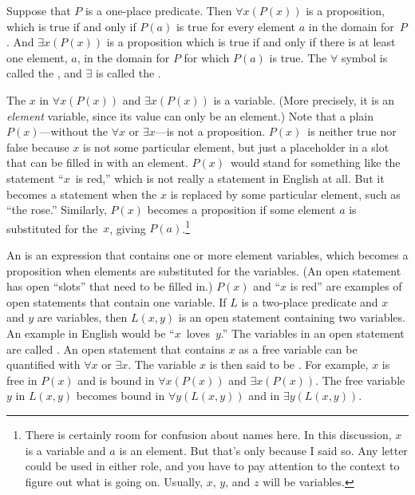\begin{definition}
Suppose that $P$ is a one-place predicate.  Then $\forall x(P(x))$ is
a proposition, which is true if and only if $P(a)$ is true for every
element $a$ in the domain for~$P$.  And $\exists x(P(x))$
is a proposition which is true if and only if there is at least one
element, $a$, in the domain for $P$ for which $P(a)$ is
true.  The $\forall$ symbol is called the ,
and $\exists$ is called the .
\end{definition}

The $x$ in $\forall x(P(x))$ and $\exists x(P(x))$ is a variable.
(More precisely, it is an \emph{element} variable, since its value
can only be an element.)
Note that a plain $P(x)$---without the $\forall x$ or $\exists x$---is
not a proposition.  $P(x)$~is neither true nor false because $x$
is not some particular element, but just a placeholder in a slot that
can be filled in with an element.  $P(x)$~would stand for
something like the statement ``$x$~is red,'' which is not really a
statement in English at all.  But it becomes a statement when
the $x$ is replaced by some particular element, such as ``the rose.''
Similarly, $P(x)$ becomes a proposition if some element $a$ is substituted
for the~$x$, giving $P(a)$.\footnote{There is certainly room for confusion
about names here.  In this discussion, $x$ is a variable and $a$ is 
an element.  But that's only because I said so.  Any letter could be used
in either role, and you have to pay attention to the context to
figure out what is going on.  Usually, $x$, $y$, and $z$ will be variables.}

An  is an expression that contains one or more element 
variables, which becomes a proposition when elements are substituted
for the variables.  (An open statement has open ``slots'' that need to
be filled in.)  $P(x)$ and ``$x$ is red'' are examples of open 
statements that contain one variable.  If $L$ is a two-place predicate
and $x$ and $y$ are variables, then $L(x,y)$ is an open statement
containing two variables.  An example in English would be
``$x$~loves~$y$.''  The variables in an open statement are called 
.  An open statement that contains $x$ as a free
variable can be quantified with $\forall x$ or $\exists x$.
The variable $x$ is then said to be .  For example,
$x$ is free in $P(x)$ and is bound in $\forall x(P(x))$ and
$\exists x(P(x))$.  The free variable $y$ in $L(x,y)$ becomes
bound in $\forall y(L(x,y))$ and in $\exists y(L(x,y))$.

